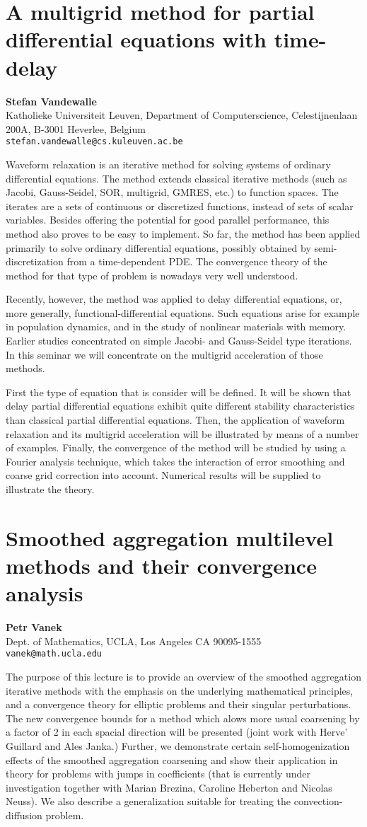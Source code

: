 \documentclass[11pt]{article}
\newcommand{\nextab}[4]{
	\section{#2}
	{\bf #1} \\ \nopagebreak
	{#3} \\ \nopagebreak
	{\tt #4} \nopagebreak
	}
\begin{document}
\nextab{Stefan Vandewalle}
	{A multigrid method for partial differential
		equations with time-delay}
	{Katholieke Universiteit Leuven, Department of Computerscience,
	Celestijnenlaan 200A, B-3001 Heverlee, Belgium}
	{stefan.vandewalle@cs.kuleuven.ac.be}

Waveform relaxation is an iterative method for solving systems of
ordinary differential equations.  The  method extends classical
iterative methods (such as Jacobi, Gauss-Seidel, SOR, multigrid,
GMRES, etc.) to function spaces.  The iterates are a sets of
continuous or discretized functions, instead of sets of scalar variables.
Besides offering the potential for good parallel performance, this method
also proves to be easy to implement.  So far, the method has been applied
primarily to solve ordinary differential equations, possibly obtained
by semi-discretization from a time-dependent PDE.
The convergence theory of the method for that type of problem is
nowadays very well understood.

Recently, however,  the method was applied to delay differential equations,
or, more generally, functional-differential equations.  Such equations arise
for example in population dynamics, and in the study of nonlinear materials
with memory.  Earlier studies concentrated on simple Jacobi- and Gauss-Seidel
type iterations.  In this seminar we will concentrate on the multigrid
acceleration of those methods.

First the type of equation that is consider will be defined.  It will be
shown that delay partial differential equations exhibit quite different
stability characteristics than classical partial differential equations.
Then, the application of waveform relaxation and its multigrid
acceleration will be illustrated by means of a number of  examples.
Finally, the convergence of the method will be  studied by using a Fourier
analysis technique, which takes the interaction of error smoothing and
coarse grid correction into account.
Numerical results will be supplied to illustrate the theory.


\nextab{Petr Vanek}
	{Smoothed aggregation multilevel methods and
		their convergence analysis}
	{Dept. of Mathematics, UCLA, Los Angeles CA 90095-1555}
	{vanek@math.ucla.edu}

The purpose of this lecture is to provide an overview of the smoothed
aggregation iterative methods with the emphasis on the underlying mathematical
principles, and a convergence theory for elliptic problems and their
singular perturbations. The new convergence bounds
for a method which alows more usual coarsening by a factor of 2 in each
spacial direction will be presented (joint work with Herve' Guillard
and Ales Janka.)
Further, we demonstrate certain
self-homogenization effects of the smoothed aggregation coarsening and
show their application in theory for problems with jumps in coefficients
(that is currently under investigation together with Marian Brezina,
Caroline Heberton and Nicolas Neuss). We also describe a generalization
suitable for treating the convection-diffusion problem.
\end{document}
